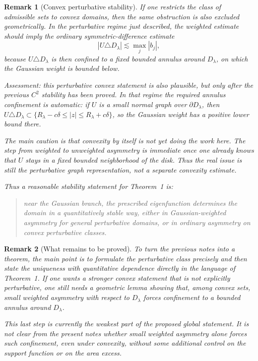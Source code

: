 \documentclass[a4paper,11pt,reqno]{amsart}
\newtheorem{remark}{Remark}[section]
\begin{document}
\begin{remark}[Convex perturbative stability]
If one restricts the class of admissible sets to convex domains, then the same
obstruction is also excluded geometrically. In the perturbative regime just
described, the weighted estimate should imply the ordinary symmetric-difference
estimate
\[
|U\triangle D_\lambda|\lesssim \max_j |b_j|,
\]
because \(U\triangle D_\lambda\) is then confined to a fixed bounded annulus
around \(D_\lambda\), on which the Gaussian weight is bounded below.

Assessment: this perturbative convex statement is also plausible, but only after
the previous \(C^2\) stability has been proved. In that regime the required
annulus confinement is automatic: if \(U\) is a small normal graph over
\(\partial D_\lambda\), then \(U\triangle D_\lambda\subset
\{R_\lambda-c\delta\le |z|\le R_\lambda+c\delta\}\), so the Gaussian weight has
a positive lower bound there.

The main caution is that convexity by itself is not yet doing the work here.
The step from weighted to unweighted asymmetry is immediate once one already
knows that \(U\) stays in a fixed bounded neighborhood of the disk. Thus the
real issue is still the perturbative graph representation, not a separate
convexity estimate.

Thus a reasonable stability statement for Theorem~1 is:
\begin{quote}
near the Gaussian branch, the prescribed eigenfunction determines the domain in
a quantitatively stable way, either in Gaussian-weighted asymmetry for general
perturbative domains, or in ordinary asymmetry on convex perturbative classes.
\end{quote}
\end{remark}

\begin{remark}[What remains to be proved]
To turn the previous notes into a theorem, the main point is to formulate the
perturbative class precisely and then state the uniqueness with quantitative
dependence directly in the language of Theorem~1. If one wants a stronger
convex statement that is not explicitly perturbative, one still needs a
geometric lemma showing that, among convex sets, small weighted asymmetry with
respect to \(D_\lambda\) forces confinement to a bounded annulus around
\(D_\lambda\).

This last step is currently the weakest part of the proposed global statement.
It is not clear from the present notes whether small weighted asymmetry alone
forces such confinement, even under convexity, without some additional control
on the support function or on the area excess.
\end{remark}
\end{document}
